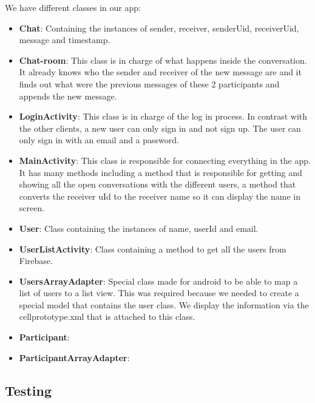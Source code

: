 We have different classes in our app:

\begin{itemize}
	\item \textbf{Chat}: Containing the instances of sender, receiver, senderUid, receiverUid, message and timestamp.
	
	\item \textbf{Chat-room}: This class is in charge of what happens inside the conversation. It already knows who the sender and receiver of the new message are and it finds out what were the previous messages of these 2 participants and appends the new message. 
	
	\item \textbf{LoginActivity}: This class is in charge of the log in process. In contrast with the other clients, a new user can only sign in and not sign up. The user can only sign in with an email and a password.
	
	\item \textbf{MainActivity}: This class is responsible for connecting everything in the app. It has many methods including a method that is responsible for getting and showing all the open conversations with the different users, a method that converts the receiver uId to the receiver name so it can display the name in screen.
	
	\item \textbf{User}: Class containing the instances of name, userId and email.
	
	\item \textbf{UserListActivity}: Class containing a method to get all the users from Firebase.

	\item \textbf{UsersArrayAdapter}: Special class made for android to be able to map a list of users to a list view. This was required because we needed to create a special model that contains the user class. We display the information via the cellprototype.xml that is attached to this class.
	
	\item \textbf{Participant}: 
	
	\item \textbf{ParticipantArrayAdapter}: 
	
\end{itemize}




\subsection{Testing}

